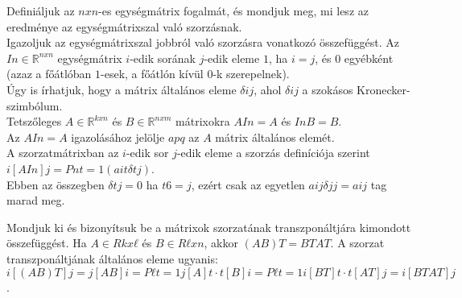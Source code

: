 \begin{frame}
  \begin{tcolorbox}[title={7. (4p)}]
      Deﬁniáljuk az $n x n$-es egységmátrix fogalmát, és mondjuk meg, mi lesz az eredménye az egységmátrixszal való szorzásnak.\\
      
      Igazoljuk az egységmátrixszal jobbról való szorzásra vonatkozó összefüggést. 
  \tcblower
    Az $In \in \mathbb{R}^{n x n}$ egységmátrix $i$-edik sorának $j$-edik eleme $1$, ha $i = j$, és $0$ egyébként (azaz a főátlóban $1$-esek, a főátlón kívül $0$-k szerepelnek).\\
    
    Úgy is írhatjuk, hogy a mátrix általános eleme ${\delta}ij$, ahol ${\delta}ij$ a szokásos Kronecker-szimbólum.\\
    
    Tetszőleges $A \in \mathbb{R}^{k x n}$ és $B \in \mathbb{R}^{n x m}$ mátrixokra $AIn = A$ és $InB = B$.\\
    
    Az $AIn = A$ igazolásához jelölje $apq$ az $A$ mátrix általános elemét.\\
    
    A szorzatmátrixban az $i$-edik sor $j$-edik eleme a szorzás deﬁníciója szerint $i[AIn]j = Pn t=1(ait{\delta}tj)$.\\
    
    Ebben az összegben ${\delta}tj = 0$ ha $t 6= j$, ezért csak az egyetlen $aij{\delta}jj = aij$ tag marad meg.
  \end{tcolorbox}
\end{frame}


\begin{frame}
  \begin{tcolorbox}[title={8. (4p)}]
       Mondjuk ki és bizonyítsuk be a mátrixok szorzatának transzponáltjára kimondott összefüggést. 
  \tcblower
    Ha $A \in Rkxℓ$ és $B \in Rℓxn$, akkor $(AB)T = BTAT$. A szorzat transzponáltjának általános eleme ugyanis: $i[(AB)T]j = j[AB]i = Pℓ t=1 j[A]t  \cdot  t[B]i = Pℓ t=1 i[BT]t  \cdot  t[AT]j = i[BTAT]j$.
  \end{tcolorbox}
\end{frame}

